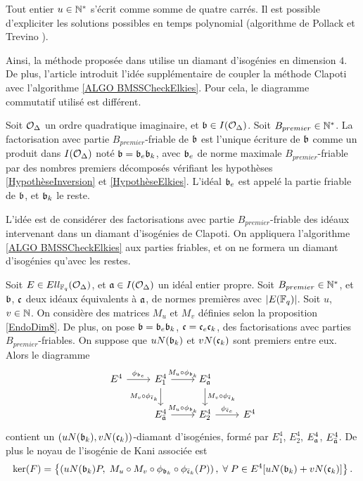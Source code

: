 \begin{Rem}
	Tout entier $u\in\mathbb{N}^*$ s'écrit comme somme de quatre carrés. Il est possible d'expliciter les solutions possibles en temps polynomial (algorithme de Pollack et Trevino \cite{PolackTrevino}).
\end{Rem}

Ainsi, la méthode proposée dans \cite{Clapoti} utilise un diamant d'isogénies en dimension $4$. De plus, l'article \cite{Pegasis} introduit l'idée supplémentaire de coupler la méthode Clapoti avec l'algorithme \ref{ALGO BMSSCheckElkies}. Pour cela, le diagramme commutatif utilisé est différent. 

\begin{Def}
	Soit $\mathcal{O}_{\Delta}$ un ordre quadratique imaginaire, et $\mathfrak{b}\in I(\mathcal{O}_{\Delta})$. Soit $B_{premier}\in\mathbb{N}^*$. La factorisation avec partie $B_{premier}$-friable de $\mathfrak{b}$ est l'unique écriture de $\mathfrak{b}$ comme un produit dans $I(\mathcal{O}_{\Delta})$ noté $\mathfrak{b} = \mathfrak{b}_e\mathfrak{b}_k$, avec $\mathfrak{b}_e$ de norme maximale $B_{premier}$-friable par des nombres premiers décomposés vérifiant les hypothèses \ref{HypothèseInversion} et \ref{HypothèseElkies}. L'idéal $\mathfrak{b}_e$ est appelé la partie friable de $\mathfrak{b}$, et $\mathfrak{b}_k$ le reste. 
\end{Def}
L'idée est de considérer des factorisations avec partie $B_{premier}$-friable des idéaux intervenant dans un diamant d'isogénies de Clapoti. On appliquera l'algorithme \ref{ALGO BMSSCheckElkies} aux parties friables, et on ne formera un diamant d'isogénies qu'avec les restes. 
\begin{Prop}\label{diamantPegasis}
	Soit $E\in Ell_{\mathbb{F}_{q}}(\mathcal{O}_{\Delta})$, et $\mathfrak{a}\in I(\mathcal{O}_{\Delta})$ un idéal entier propre. Soit $B_{premier}\in\mathbb{N}^*$, et $\mathfrak{b}$, $\mathfrak{c}$ deux idéaux équivalents à $\mathfrak{a}$, de normes premières avec $|E(\mathbb{F}_{q})|$. Soit $u$, $v\in\mathbb{N}$. On considère des matrices $M_u$ et $M_v$ définies selon la proposition \ref{EndoDim8}. De plus, on pose $\mathfrak{b} = \mathfrak{b}_e\mathfrak{b}_k$, $\mathfrak{c} = \mathfrak{c}_e\mathfrak{c}_k$, des factorisations avec parties $B_{premier}$-friables. On suppose que $uN(\mathfrak{b}_k)$ et $vN(\mathfrak{c}_k)$ sont premiers entre eux. Alors le diagramme 
	\[\begin{tikzcd}
		E^4 \arrow{r}{\phi_{\bR_e}} 
		& E_1^4 \arrow{r}{M_u\circ\phi_{\bR_k}} \arrow[swap]{d}{M_v\circ\phi_{\bar{\cR}_k}} 
		& E_\aR^4 \arrow{d}{M_v\circ\phi_{\bar{\cR}_k}} \\
		& E_{\bar{\aR}}^4 \arrow{r}{M_u\circ\phi_{\bR_k}} 
		& E_2^4 \arrow{r}{\phi_{\bar{\cR}_e}} 
		& E^4
	\end{tikzcd}
	\]
	contient un $(uN(\mathfrak{b}_k),vN(\mathfrak{c}_k))$-diamant d'isogénies, formé par $E_1^4$, $E_2^4$, $E_{\mathfrak{a}}^4$, $E_{\bar{\mathfrak{a}}}^4$. De plus le noyau de l'isogénie de Kani associée est 
	\begin{equation*}
		\ker(F)=\left\lbrace \left( uN(\mathfrak{b}_k)P,\;M_u\circ M_v\circ\phi_{\mathfrak{b}_k}\circ\phi_{\bar{\mathfrak{c}}_k}(P)\right),\;\forall\; P\in E^4[uN(\mathfrak{b}_k) + vN(\mathfrak{c}_k)] \right\rbrace .
	\end{equation*}
\end{Prop}

